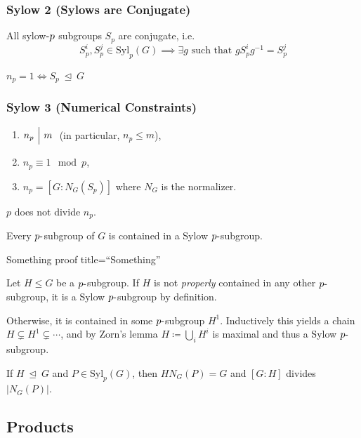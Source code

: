 \hypertarget{sylow-2-sylows-are-conjugate}{%
\subsubsection{Sylow 2 (Sylows are
Conjugate)}\label{sylow-2-sylows-are-conjugate}}

All sylow\({\hbox{-}}p\) subgroups \(S_p\) are conjugate, i.e. \[
S_p^i, S_p^j \in \mathrm{Syl}_p(G) \implies \exists g \text{ such that } g S_p^i g^{-1}= S_p^j
\]

\(n_p = 1 \iff S_p {~\trianglelefteq~}G\)

\hypertarget{sylow-3-numerical-constraints}{%
\subsubsection{Sylow 3 (Numerical
Constraints)}\label{sylow-3-numerical-constraints}}

\begin{enumerate}
\def\labelenumi{\arabic{enumi}.}
\item
  \(n_p {~\Bigm|~}m~\) (in particular, \(n_p \leq m\)),
\item
  \(n_p \equiv 1 \mod p\),
\item
  \(n_p = [G : N_G(S_p)]\) where \(N_G\) is the normalizer.
\end{enumerate}

\(p\) does not divide \(n_p\).

Every \(p{\hbox{-}}\)subgroup of \(G\) is contained in a Sylow
\(p{\hbox{-}}\)subgroup.

Something proof title=``Something''

Let \(H \leq G\) be a \(p{\hbox{-}}\)subgroup. If \(H\) is not
\emph{properly} contained in any other \(p{\hbox{-}}\)subgroup, it is a
Sylow \(p{\hbox{-}}\)subgroup by definition.

Otherwise, it is contained in some \(p{\hbox{-}}\)subgroup \(H^1\).
Inductively this yields a chain \(H \subsetneq H^1 \subsetneq \cdots\),
and by Zorn's lemma \(H\coloneqq\bigcup_i H^i\) is maximal and thus a
Sylow \(p{\hbox{-}}\)subgroup.

If \(H{~\trianglelefteq~}G\) and \(P \in \mathrm{Syl}_p(G)\), then
\(H N_G(P) = G\) and \([G: H]\) divides
\({\left\lvert {N_G(P)} \right\rvert}\).

\hypertarget{products}{%
\subsection{Products}\label{products}}

